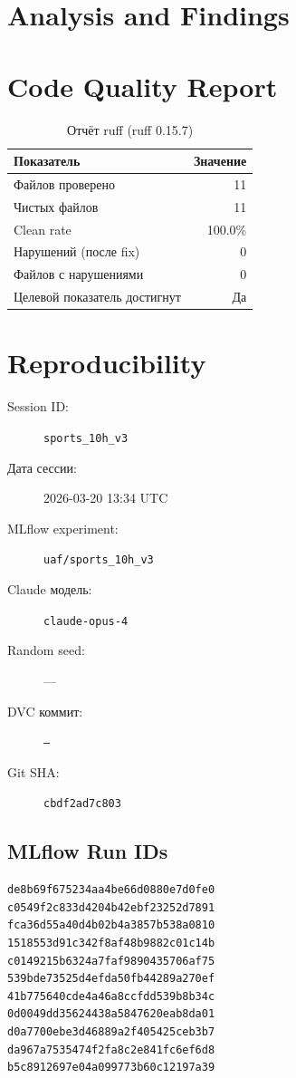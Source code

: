 \documentclass[12pt,a4paper]{article}
\begin{document}
\section{Analysis and Findings}









\section{Code Quality Report}

\begin{table}[H]
\centering
\caption{Отчёт ruff (ruff 0.15.7)}
\begin{tabular}{lr}
\toprule
Показатель & Значение \\
\midrule
Файлов проверено & 11 \\
Чистых файлов & 11 \\
Clean rate & \textcolor{passcolor}{100.0\%} \\
Нарушений (после fix) & \textcolor{passcolor}{0} \\
Файлов с нарушениями & 0 \\
Целевой показатель достигнут & \textcolor{passcolor}{Да} \\
\bottomrule
\end{tabular}
\end{table}





\section{Reproducibility}

\begin{description}
    \item[Session ID:] \texttt{sports\_10h\_v3}
    \item[Дата сессии:] 2026-03-20 13:34 UTC
    \item[MLflow experiment:] \texttt{uaf/sports\_10h\_v3}
    \item[Claude модель:] \texttt{claude-opus-4}
    \item[Random seed:] ---
    \item[DVC коммит:] \texttt{---}
    \item[Git SHA:] \texttt{cbdf2ad7c803}
\end{description}

\subsection*{MLflow Run IDs}

\begin{lstlisting}
de8b69f675234aa4be66d0880e7d0fe0
c0549f2c833d4204b42ebf23252d7891
fca36d55a40d4b02b4a3857b538a0810
1518553d91c342f8af48b9882c01c14b
c0149215b6324a7faf9890435706af75
539bde73525d4efda50fb44289a270ef
41b775640cde4a46a8ccfdd539b8b34c
0d0049dd35624438a5847620eab8da01
d0a7700ebe3d46889a2f405425ceb3b7
da967a7535474f2fa8c2e841fc6ef6d8
b5c8912697e04a099773b60c12197a39
\end{lstlisting}
\end{document}
